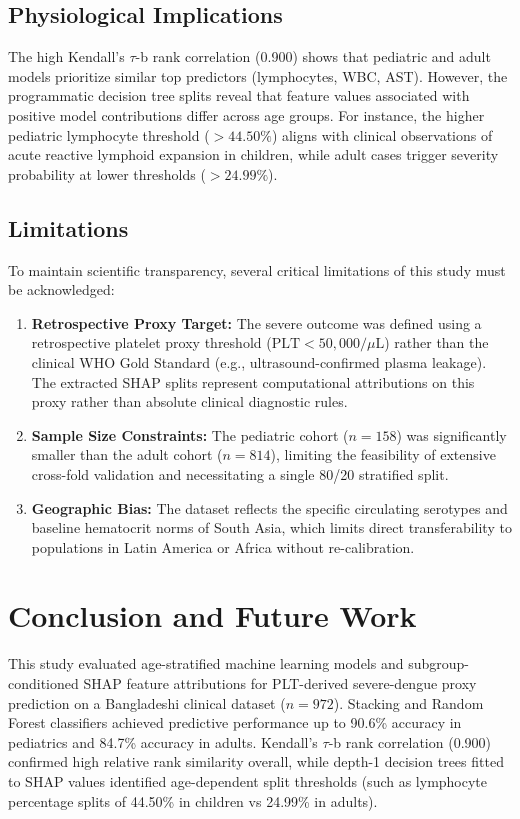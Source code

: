 \documentclass[conference]{IEEEtran}
\begin{document}
\subsection{Physiological Implications}
The high Kendall's $\tau$-b rank correlation (0.900) shows that pediatric and adult models prioritize similar top predictors (lymphocytes, WBC, AST). However, the programmatic decision tree splits reveal that feature values associated with positive model contributions differ across age groups. For instance, the higher pediatric lymphocyte threshold ($> 44.50\%$) aligns with clinical observations of acute reactive lymphoid expansion in children, while adult cases trigger severity probability at lower thresholds ($> 24.99\%$).

\subsection{Limitations}
To maintain scientific transparency, several critical limitations of this study must be acknowledged:
\begin{enumerate}
    \item \textbf{Retrospective Proxy Target:} The severe outcome was defined using a retrospective platelet proxy threshold ($\text{PLT} < 50,000 / \mu\text{L}$) rather than the clinical WHO Gold Standard (e.g., ultrasound-confirmed plasma leakage). The extracted SHAP splits represent computational attributions on this proxy rather than absolute clinical diagnostic rules.
    \item \textbf{Sample Size Constraints:} The pediatric cohort ($n=158$) was significantly smaller than the adult cohort ($n=814$), limiting the feasibility of extensive cross-fold validation and necessitating a single 80/20 stratified split.
    \item \textbf{Geographic Bias:} The dataset reflects the specific circulating serotypes and baseline hematocrit norms of South Asia, which limits direct transferability to populations in Latin America or Africa without re-calibration.
\end{enumerate}

\section{Conclusion and Future Work}
This study evaluated age-stratified machine learning models and subgroup-conditioned SHAP feature attributions for PLT-derived severe-dengue proxy prediction on a Bangladeshi clinical dataset ($n=972$). Stacking and Random Forest classifiers achieved predictive performance up to 90.6\% accuracy in pediatrics and 84.7\% accuracy in adults. Kendall's $\tau$-b rank correlation (0.900) confirmed high relative rank similarity overall, while depth-1 decision trees fitted to SHAP values identified age-dependent split thresholds (such as lymphocyte percentage splits of 44.50\% in children vs 24.99\% in adults).
\end{document}
